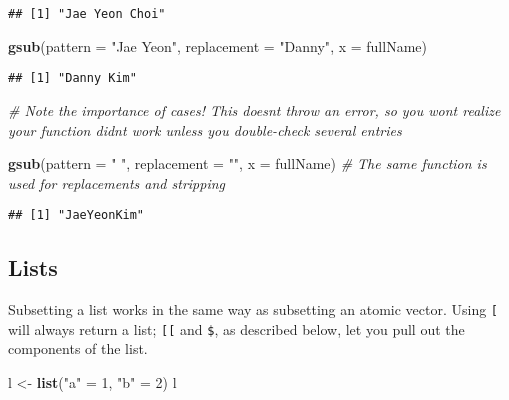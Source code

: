 \documentclass[
]{book}
\newenvironment{Shaded}{\begin{snugshade}}{\end{snugshade}}
\newcommand{\CommentTok}[1]{\textcolor[rgb]{0.56,0.35,0.01}{\textit{#1}}}
\newcommand{\DataTypeTok}[1]{\textcolor[rgb]{0.13,0.29,0.53}{#1}}
\newcommand{\DecValTok}[1]{\textcolor[rgb]{0.00,0.00,0.81}{#1}}
\newcommand{\KeywordTok}[1]{\textcolor[rgb]{0.13,0.29,0.53}{\textbf{#1}}}
\newcommand{\NormalTok}[1]{#1}
\newcommand{\StringTok}[1]{\textcolor[rgb]{0.31,0.60,0.02}{#1}}
\begin{document}
\begin{verbatim}
## [1] "Jae Yeon Choi"
\end{verbatim}

\begin{Shaded}
\begin{Highlighting}[]
\KeywordTok{gsub}\NormalTok{(}\DataTypeTok{pattern =} \StringTok{"Jae Yeon"}\NormalTok{, }\DataTypeTok{replacement =} \StringTok{"Danny"}\NormalTok{, }\DataTypeTok{x =}\NormalTok{ fullName)}
\end{Highlighting}
\end{Shaded}

\begin{verbatim}
## [1] "Danny Kim"
\end{verbatim}

\begin{Shaded}
\begin{Highlighting}[]
\CommentTok{\# Note the importance of cases! This doesn\textquotesingle{}t throw an error, so you won\textquotesingle{}t realize your function didn\textquotesingle{}t work unless you double{-}check several entries}

\KeywordTok{gsub}\NormalTok{(}\DataTypeTok{pattern =} \StringTok{" "}\NormalTok{, }\DataTypeTok{replacement =} \StringTok{""}\NormalTok{, }\DataTypeTok{x =}\NormalTok{ fullName) }\CommentTok{\# The same function is used for replacements and stripping}
\end{Highlighting}
\end{Shaded}

\begin{verbatim}
## [1] "JaeYeonKim"
\end{verbatim}

\hypertarget{lists-1}{%
\subsection{Lists}\label{lists-1}}

Subsetting a list works in the same way as subsetting an atomic vector. Using \texttt{{[}} will always return a list; \texttt{{[}{[}} and \texttt{\$}, as described below, let you pull out the components of the list.

\begin{Shaded}
\begin{Highlighting}[]
\NormalTok{l \textless{}{-}}\StringTok{ }\KeywordTok{list}\NormalTok{(}\StringTok{"a"}\NormalTok{ =}\StringTok{ }\DecValTok{1}\NormalTok{, }\StringTok{"b"}\NormalTok{ =}\StringTok{ }\DecValTok{2}\NormalTok{)}
\NormalTok{l}
\end{Highlighting}
\end{Shaded}
\end{document}
